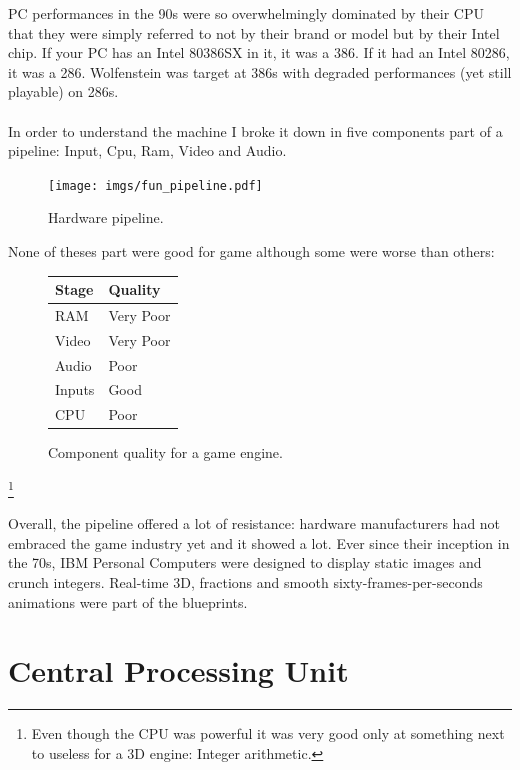 \documentclass[book.tex]{subfiles}
\begin{document}
PC performances in the 90s were so overwhelmingly dominated by their CPU that they were simply referred to not by their brand or model but by their Intel chip. If your PC has an Intel 80386SX in it, it was a 386. If it had an Intel 80286, it was a 286. Wolfenstein was target at 386s with degraded performances (yet still playable) on 286s.\\
\\
In order to understand the machine I broke it down in five components part of a pipeline: Input, Cpu, Ram, Video and Audio.\\
 \bigskip
\begin{figure}[H]
\centering
\texttt{[image: imgs/fun\_pipeline.pdf]}
%
\caption{Hardware pipeline.}
\label{fig:digraph}
\end{figure}

None of theses part were good for game although some were worse than others:

 \bigskip

\begin{figure}[H]
\centering
\begin{tabularx}{\textwidth}{ X X  }
  \toprule
  \textbf{Stage} & \textbf{Quality} \\ \bottomrule
  RAM & Very Poor \\ 
  Video & Very Poor \\ 
  Audio & Poor \\ 
  Inputs & Good \\ 
  CPU & Poor \\ \bottomrule
\end{tabularx}
\caption{Component quality for a game engine.}  \label{fig:Component quality for a game engine.}
\end{figure}

\footnote{Even though the CPU was powerful it was very good only at something next to useless for a 3D engine: Integer arithmetic.}

Overall, the pipeline offered a lot of resistance: hardware manufacturers had not embraced the game industry yet and it showed a lot. Ever since their inception in the 70s, IBM Personal Computers were designed to display static images and crunch integers. Real-time 3D, fractions and smooth sixty-frames-per-seconds animations were part of the blueprints.

\section{Central Processing Unit}
\end{document}
